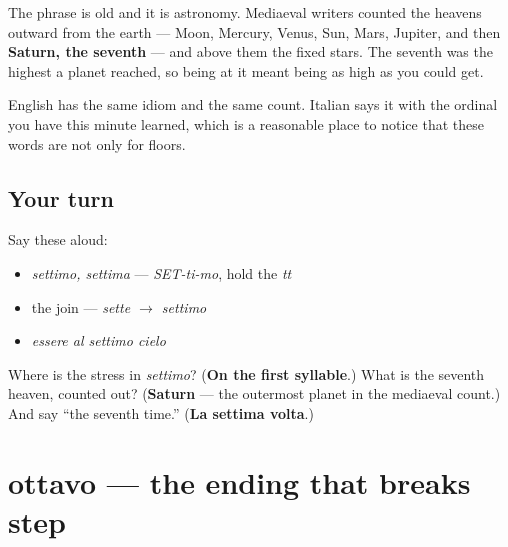The phrase is old and it is astronomy. Mediaeval writers counted the heavens outward from the earth — Moon, Mercury, Venus, Sun, Mars, Jupiter, and then \textbf{Saturn, the seventh} — and above them the fixed stars. The seventh was the highest a planet reached, so being at it meant being as high as you could get.

English has the same idiom and the same count. Italian says it with the ordinal you have this minute learned, which is a reasonable place to notice that these words are not only for floors.

\subsection*{Your turn}
Say these aloud:

\begin{itemize}
\raggedright
  \item \emph{settimo, settima} — \emph{SET-ti-mo}, hold the \emph{tt}
  \item the join — \emph{sette $\to$ settimo}
  \item \emph{essere al settimo cielo}
\end{itemize}

\begin{tcolorbox}[breakable,colback=teal!4,colframe=teal!35!black,title={Before you move on}]
Where is the stress in \emph{settimo}? (\textbf{On the first syllable}.) What is the seventh heaven, counted out? (\textbf{Saturn} — the outermost planet in the mediaeval count.) And say \textquotedblleft{}the seventh time.\textquotedblright{} (\textbf{La settima volta}.)
\end{tcolorbox}
\section[ottavo / ottava]{ottavo — the ending that breaks step}

\label{lesson:IT-C27-ottavo}



